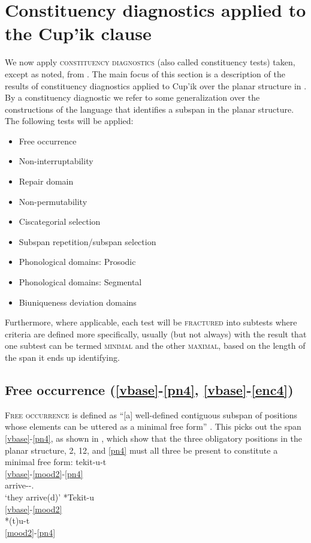 \documentclass[output=paper]{langscibook}
\begin{document}
\section{Constituency diagnostics applied to the Cup'ik clause} \label{sec:5}

We now apply \textsc{constituency} \textsc{diagnostics} (also called constituency tests) taken, except as noted, from \citet{Tallman2021}. The main focus of this section is a description of the results of constituency diagnostics applied to Cup'ik over the planar structure in . By a constituency diagnostic we refer to some generalization over the constructions of the language that identifies a subspan in the planar structure. The following tests will be applied:
\begin{itemize}
\item 
Free occurrence
\item 
Non-interruptability
\item 
Repair domain
\item 
Non-permutability
\item 
Ciscategorial selection
\item 
Subspan repetition/subspan selection
\item 
Phonological domains: Prosodic
\item 
Phonological domains: Segmental
\item 
Biuniqueness deviation domains
\end{itemize}

\hspace*{-4.1pt}Furthermore, where applicable, each test will be \textsc{fractured} into subtests where criteria are defined more specifically, usually (but not always) with the result that one subtest can be termed \textsc{minimal} and the other \textsc{maximal}, based on the length of the span it ends up identifying.

\subsection{Free occurrence (\ref{vbase}-\ref{pn4}, \ref{vbase}-\ref{enc4})} \label{sec:5.1}

F\textsc{ree} \textsc{occurrence} is defined as ``[a] well-defined contiguous subspan of positions whose elements can be uttered as a minimal free form'' \citep[16]{Tallman2021}. This picks out the span \ref{vbase}-\ref{pn4}, as shown in , which show that the three obligatory positions in the planar structure, 2, 12, and \ref{pn4} must all three be present to constitute a minimal free form:
\ea\label{ex:key:22}
    \ea \label{ex:key:22a}
    \glll tekit-u-t\\
     \ref{vbase}-\ref{mood2}-\ref{pn4} \\
     arrive-\Ind{}-\Tpl.\Sarg{}\\
    \glt `they arrive(d)'
    \ex\label{ex:key:22b} 
    *Tekit-u\\
        \ref{vbase}-\ref{mood2} \\
    \ex\label{ex:key:22c}
    *(t)u-t\\
    \ref{mood2}-\ref{pn4} \\
    \z
\z
\end{document}
